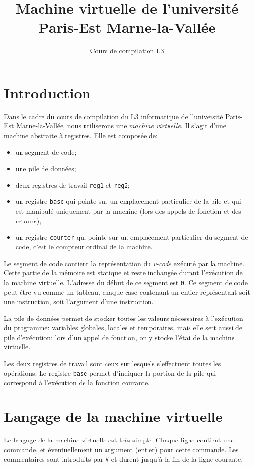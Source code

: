 \documentclass[12pt,a4paper]{article}
\title{Machine virtuelle de l'université Paris-Est Marne-la-Vallée}
\author{Cours de compilation L3}
\begin{document}
\maketitle

\bigskip
\section{Introduction}

Dans le cadre du cours de compilation du L3 informatique de
l'université Paris-Est Marne-la-Vallée, nous utiliserons une \emph{machine virtuelle}.
Il s'agit d'une machine abstraite à registres.  Elle
est composée de:
\begin{itemize}
\item un segment de code;
\item une pile de données;
\item deux registres de travail \texttt{reg1} et \texttt{reg2};
\item un registre \texttt{base} qui pointe sur un emplacement
  particulier de la pile et qui est manipulé uniquement par la machine
  (lors des appels de fonction et des retours);
\item un registre \texttt{counter} qui pointe sur un emplacement
  particulier du segment de code, c'est le compteur ordinal de la
  machine.
\end{itemize}

Le segment de code contient la représentation du \emph{v-code} exécuté
par la machine. Cette partie de la mémoire est statique et reste
inchangée durant l'exécution de la machine virtuelle. L'adresse du
début de ce segment est \texttt{0}. Ce segment de code peut être vu comme
un tableau, chaque case contenant un entier représentant soit une
instruction, soit l'argument d'une instruction.

La pile de données permet de stocker toutes les valeurs nécessaires à
l'exécution du programme: variables globales, locales et temporaires,
mais elle sert aussi de pile d'exécution: lors d'un appel de fonction,
on y stocke l'état de la machine virtuelle.

Les deux registres de travail sont ceux sur lesquels s'effectuent
toutes les opérations. Le registre \texttt{base} permet d'indiquer la
portion de la pile qui correspond à l'exécution de la fonction
courante.

\section{Langage de la machine virtuelle}
Le langage de la machine virtuelle est très simple. Chaque ligne
contient une commande, et éventuellement un
argument (entier) pour cette commande.
Les commentaires sont introduits par \texttt{\#} et durent jusqu'à la
fin de la ligne courante.
\end{document}
